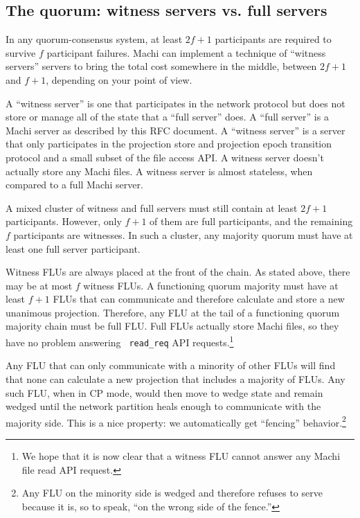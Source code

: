 \documentclass[preprint,10pt]{sigplanconf}
\begin{document}
\subsection{The quorum: witness servers vs. full servers}

In any quorum-consensus system, at least $2f+1$ participants are
required to survive $f$ participant failures.  Machi can implement a
technique of ``witness servers'' servers to bring the total cost
somewhere in the middle, between $2f+1$ and $f+1$, depending on your
point of view.

A ``witness server'' is one that participates in the network protocol
but does not store or manage all of the state that a ``full server''
does.  A ``full server'' is a Machi server as
described by this RFC document.  A ``witness server'' is a server that
only participates in the projection store and projection epoch
transition protocol and a small subset of the file access API.
A witness server doesn't actually store any
Machi files.  A witness server is almost stateless, when compared to a
full Machi server.

A mixed cluster of witness and full servers must still contain at
least $2f+1$ participants.  However, only $f+1$ of them are full
participants, and the remaining $f$ participants are witnesses.  In
such a cluster, any majority quorum must have at least one full server
participant.

Witness FLUs are always placed at the front of the chain.  As stated
above, there may be at most $f$ witness FLUs.  A functioning quorum
majority
must have at least $f+1$ FLUs that can communicate and therefore
calculate and store a new unanimous projection.  Therefore, any FLU at
the tail of a functioning quorum majority chain must be full FLU.  Full FLUs
actually store Machi files, so they have no problem answering {\tt
  read\_req} API requests.\footnote{We hope that it is now clear that
  a witness FLU cannot answer any Machi file read API request.}

Any FLU that can only communicate with a minority of other FLUs will
find that none can calculate a new projection that includes a
majority of FLUs.  Any such FLU, when in CP mode, would then move to
wedge state and remain wedged until the network partition heals enough
to communicate with the majority side.  This is a nice property: we
automatically get ``fencing'' behavior.\footnote{Any FLU on the minority side
  is wedged and therefore refuses to serve because it is, so to speak,
  ``on the wrong side of the fence.''}
\end{document}
